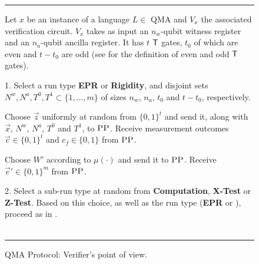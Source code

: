 \documentclass{toc}
\newcommand{\pp}{\textsc{PP}}
\begin{document}
\begin{figure}[H]
\rule[1ex]{\textwidth}{0.5pt}
\vspace{-20pt}
\justify
Let $x$ be an instance of a language $L \in$ QMA and $V_x$ the associated verification circuit. $V_x$ takes as input  an $n_w$-qubit witness register and an $n_a$-qubit ancilla register. It has $t$ $\sf T$ gates, $t_0$ of which are even and $t-t_0$ are odd (see  for the definition of even and odd $\sf T$ gates).

\justify
\vspace{-0.25cm}   %
1. Select a run type \textbf{EPR} or \textbf{Rigidity}, and disjoint sets
  $N^w,N^a, T^0,T^1\subset \{1,\ldots,m\}$ of sizes $n_w$, $n_a$,  $t_0$ and $t-t_0$, respectively.  %
\begin{description}
\setlength\itemsep{-0.17em}   %
\item[EPR] Choose $\vec{z}$ uniformly at random from $\{0,1\}^t$ and send it,
  along with $\vec{x}$, $N^w$, $N^a$, $T^0$ and $T^1$, to $\pp$. Receive measurement outcomes $\vec{c}\in\{0,1\}^t$ and $c_f\in\{0,1\}$ from $\pp$.
\item[Rigidity] Choose $W'$ according to $\mu(\cdot)$ and send it to $\pp$. Receive $\vec{e}'\in \{0,1\}^m$ from $\pp$. 
\end{description}
\vspace{-0.17cm}    %
2. Select a sub-run type at random from \textbf{Computation}, \textbf{X-Test} or \textbf{Z-Test}. Based on this choice, as well as the run type (\textbf{EPR} or ), proceed as in 
. \\   %
~\\    %
\rule[2ex]{\textwidth}{0.5pt}\vspace{-.5cm}  %
\caption{QMA Protocol: Verifier's point of view.}\label{fig:qma-protocol-V}
\end{figure}
\end{document}

